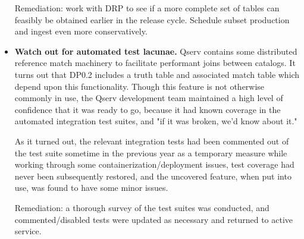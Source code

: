\begin{itemize}
  Remediation: work with DRP to see if a more complete set of tables can feasibly be obtained earlier in the
  release cycle. Schedule subset production and ingest even more conservatively.

\item
  \textbf{Watch out for automated test lacunae.}  Qserv contains some distributed reference match machinery to
  facilitate performant joins between catalogs.  It turns out that DP0.2 includes a truth table and associated
  match table which depend upon this functionality.  Though this feature is not otherwise commonly in use, the
  Qserv development team maintained a high level of confidence that it was ready to go, because it had known
  coverage in the automated integration test suites, and "if it was broken, we'd know about it."

  As it turned out, the relevant integration tests had been commented out of the test suite sometime in the
  previous year as a temporary measure while working through some containerization/deployment issues, test
  coverage had never been subsequently restored, and the uncovered feature, when put into use, was found to
  have some minor issues.

  Remediation: a thorough survey of the test suites was conducted, and commented/disabled tests were updated
  as necessary and returned to active service.

\end{itemize}

